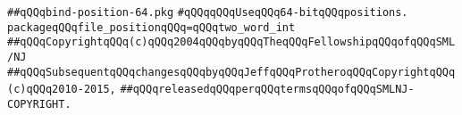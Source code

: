 \label{src/lib/std/types-only/bind-position-64.pkg}
\verb|##qQQqbind-position-64.pkg|\newline
\newline
\verb|#qQQqqQQqUseqQQq64-bitqQQqpositions.|\newline
\newline
\verb|packageqQQqfile_positionqQQq=qQQqtwo_word_int|\newline
\newline
\newline
\verb|##qQQqCopyrightqQQq(c)qQQq2004qQQqbyqQQqTheqQQqFellowshipqQQqofqQQqSML/NJ|\newline
\verb|##qQQqSubsequentqQQqchangesqQQqbyqQQqJeffqQQqProtheroqQQqCopyrightqQQq(c)qQQq2010-2015,|\newline
\verb|##qQQqreleasedqQQqperqQQqtermsqQQqofqQQqSMLNJ-COPYRIGHT.|\newline

